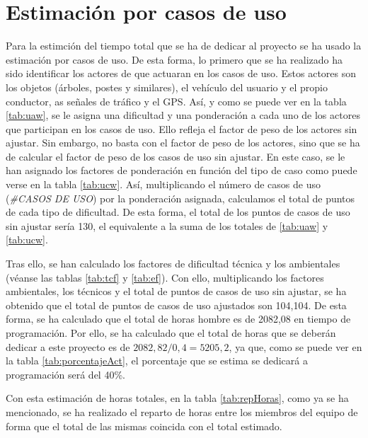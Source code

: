 \appendix
\chapter{Estimación por casos de uso}\label{sec:apEst}

Para la estimción del tiempo total que se ha de dedicar al proyecto se ha usado la estimación por casos de uso. De esta forma, lo primero que se ha realizado ha sido identificar los actores de que actuaran en los casos de uso. Estos actores son los objetos (árboles, postes y similares), el vehículo del usuario y el propio conductor, as señales de tráfico y el GPS. Así, y como se puede ver en la tabla \ref{tab:uaw}, se le asigna una dificultad y una ponderación a cada uno de los actores que participan en los casos de uso. Ello refleja el factor de peso de los actores sin ajustar. Sin embargo, no basta con el factor de peso de los actores, sino que se ha de calcular el factor de peso de los casos de uso sin ajustar. En este caso, se le han asignado los factores de ponderación en función del tipo de caso como puede verse en la tabla \ref{tab:ucw}. Así, multiplicando el número de casos de uso (\textit{\#CASOS DE USO}) por la ponderación asignada, calculamos el total de puntos de cada tipo de dificultad. De esta forma, el total de los puntos de casos de uso sin ajustar sería 130, el equivalente a la suma de los totales de \ref{tab:uaw} y \ref{tab:ucw}.
\par Tras ello, se han calculado los factores de dificultad técnica y los ambientales (véanse las tablas \ref{tab:tcf} y \ref{tab:ef}). Con ello, multiplicando los factores ambientales, los técnicos y el total de puntos de casos de uso sin ajustar, se ha obtenido que el total de puntos de casos de uso ajustados son 104,104. De esta forma, se ha calculado que el total de horas hombre es de 2082,08 en tiempo de programación. Por ello, se ha calculado que el total de horas que se deberán dedicar a este proyecto es de $2082,82/0,4=5205,2$, ya que, como se puede ver en la tabla \ref{tab:porcentajeAct}, el porcentaje que se estima se dedicará a programación será del 40\%.
\par Con esta estimación de horas totales, en la tabla \ref{tab:repHoras}, como ya se ha mencionado, se ha realizado el reparto de horas entre los miembros del equipo de forma que el total de las mismas coincida con el total estimado.

